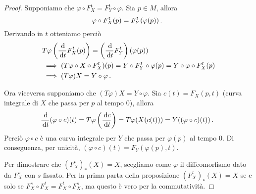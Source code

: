 \begin{proof}
	Supponiamo che $\varphi\circ F_X^t=F_Y^t\circ \varphi$. Sia $p\in M$, allora
	\begin{equation*}
		\varphi\circ F_X^t(p)=F_Y^t(\varphi(p))\, \text{. }
	\end{equation*}
	Derivando in $t$ otteniamo perciò
	\begin{align*}
		&T\varphi\left(\frac{\,\mathrm d}{\,\mathrm d t}F_X^t(p)\right)=\left(\frac{\,\mathrm d}{\,\mathrm d t}F_Y^t\right)(\varphi(p))\\
		&\implies (T\varphi\circ X\circ F_X^t)(p) = Y \circ F_Y^t \circ \varphi(p) = Y\circ \varphi \circ F_X^t(p) \\
		&\implies (T\varphi) X=Y\circ \varphi\, \text{. }
	\end{align*}
	
	Ora viceversa supponiamo che $(T\varphi)X=Y\circ\varphi$. Sia $c(t)=F_X(p,t)$ (curva integrale di $X$ che passa per $p$ al tempo 0), allora
	\begin{equation*}
		\frac {\,\mathrm d}{\,\mathrm d t}(\varphi\circ c)(t) = T\varphi \left(\frac{\,\mathrm d c}{\,\mathrm d t}\right) = T\varphi(X(c(t))) = Y((\varphi\circ c)(t))\, \text{. }
	\end{equation*}
	Perciò $\varphi\circ c$ è una curva integrale per $Y$ che passa per $\varphi(p)$ al tempo 0. Di conseguenza, per unicità, $(\varphi \circ c)(t) = F_Y(\varphi(p),t)$.
	
	Per dimostrare che $(F_X^t)_*(X)=X$, scegliamo come $\varphi$ il diffeomorfismo dato da $F_X^s$ con $s$ fissato. Per la prima parta della proposizione $(F_X^t)_*(X)=X$ se e solo se $F_X^s\circ F_X^t=F_X^t\circ F_X^s$, ma questo è vero per la commutatività.
\end{proof}






